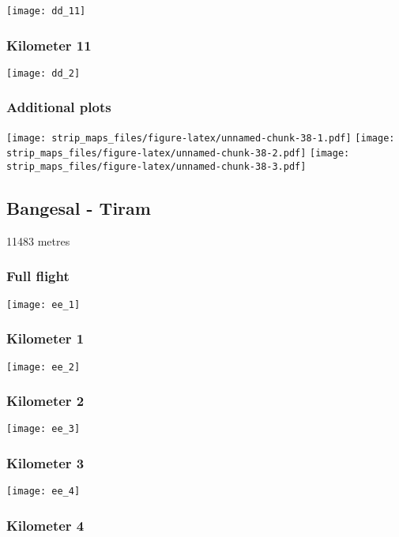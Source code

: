 \documentclass[]{article}
\begin{document}
\texttt{[image: dd\_11]}

\subsubsection{Kilometer 11}\label{kilometer-11-2}

\texttt{[image: dd\_2]}

\subsubsection{Additional plots}\label{additional-plots-29}

\texttt{[image: strip\_maps\_files/figure-latex/unnamed-chunk-38-1.pdf]}
\texttt{[image: strip\_maps\_files/figure-latex/unnamed-chunk-38-2.pdf]}
\texttt{[image: strip\_maps\_files/figure-latex/unnamed-chunk-38-3.pdf]}

\newpage

\subsection{Bangesal - Tiram}\label{bangesal---tiram}

11483 metres

\subsubsection{Full flight}\label{full-flight-30}

\texttt{[image: ee\_1]}

\subsubsection{Kilometer 1}\label{kilometer-1-30}

\texttt{[image: ee\_2]}

\subsubsection{Kilometer 2}\label{kilometer-2-30}

\texttt{[image: ee\_3]}

\subsubsection{Kilometer 3}\label{kilometer-3-30}

\texttt{[image: ee\_4]}

\subsubsection{Kilometer 4}\label{kilometer-4-29}
\end{document}
